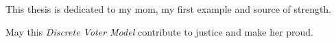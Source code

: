 
This thesis is dedicated to my mom, my first example and source of strength.

May this \textit{Discrete Voter Model} contribute to justice and make her proud.
